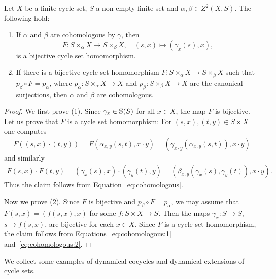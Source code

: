 \begin{proposition}
	Let $X$ be a finite cycle set, $S$ a non-empty finite set and
	$\alpha,\beta\in Z^2(X,S)$. The following hold:
	\begin{enumerate}
		\item If $\alpha$ and $\beta$ are cohomologous by $\gamma$, then
			\begin{equation*}
				F\colon S\times_\alpha X\to S\times_\beta X,\quad
				(s,x)\mapsto (\gamma_x(s),x),
			\end{equation*}
			is a bijective cycle set homomorphism.
		\item If there is a bijective cycle set homomorphism $F\colon
			S\times_\alpha X\to S\times_\beta X$ such that $p_\beta\circ F=p_\alpha$,
			where $p_\alpha\colon S\times_\alpha X\to X$ and $p_\beta\colon
			S\times_\beta X\to X$ are the canonical surjections, then $\alpha$ and
			$\beta$ are cohomologous.
	\end{enumerate}
\end{proposition}

\begin{proof}
	We first prove (1). Since $\gamma_x\in\mathbb{S}(S)$ for all $x\in X$, the map $F$
	is bijective.  Let us prove that $F$ is a cycle set homomorphism:  For 
	$(s,x),(t,y)\in S\times X$ one computes 
	\begin{align}
		\label{eq:cohomologous:1}
		F((s,x)\cdot (t,y))
		=F(\alpha_{x,y}(s,t),x\cdot y)
		=(\gamma_{x\cdot y}(\alpha_{x,y}(s,t)),x\cdot y)
	\end{align}
	and similarly 
	\begin{align}
		\label{eq:cohomologous:2}
		F(s,x)\cdot F(t,y)
		=(\gamma_x(s),x)\cdot (\gamma_y(t),y)
		=(\beta_{x,y}(\gamma_x(s),\gamma_y(t)),x\cdot y).
	\end{align}
	Thus the claim follows from Equation~\eqref{eq:cohomologous}. 
	
	Now we prove (2). Since $F$ is bijective and $p_\beta\circ F=p_\alpha$, we
	may assume that $F(s,x)=(f(s,x),x)$ for some $f\colon S\times X\to S$. Then
	the maps $\gamma_x\colon S\to S$, $s\mapsto f(s,x)$, are bijective for each
	$x\in X$. Since $F$ is a cycle set homomorphism, the claim follows 
	from Equations~\eqref{eq:cohomologous:1} and~\eqref{eq:cohomologous:2}.
\end{proof}

We collect some examples of dynamical cocycles and
dynamical extensions of cycle sets. 

